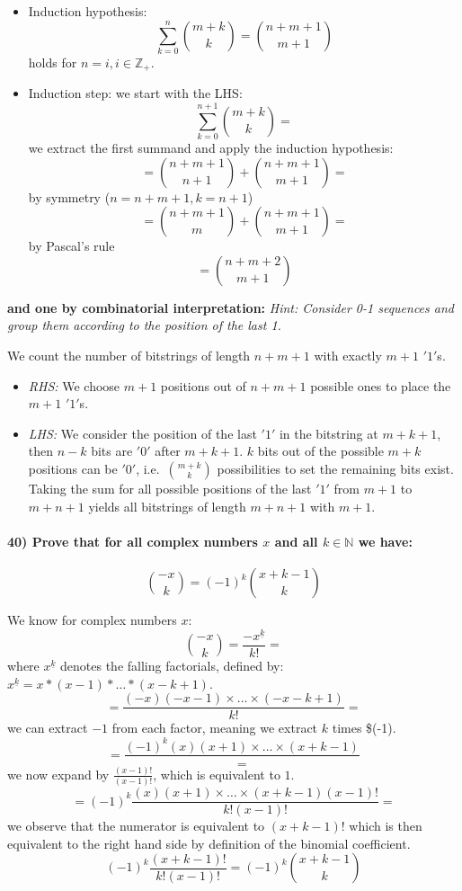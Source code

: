 \documentclass[
]{article}
\providecommand{\tightlist}{%
  \setlength{\itemsep}{0pt}\setlength{\parskip}{0pt}}
\begin{document}
\begin{itemize}
\item
  Induction hypothesis: \[
  \sum_{k=0}^{n} \binom{m+k}{k} = \binom{n+m+1}{m+1}
  \] holds for \(n=i, i \in \mathbb{Z}_{+}\).
\item
  Induction step: we start with the LHS: \[
  \sum_{k=0}^{n+1} \binom{m+k}{k} =
  \] we extract the first summand and apply the induction hypothesis: \[
  = \binom{n+m+1}{n+1} + \binom{n+m+1}{m+1} =
  \] by symmetry (\(n = n+m+1, k = n+1\)) \[
  = \binom{n+m+1}{m} + \binom{n+m+1}{m+1}=
  \] by Pascal's rule \[
  = \binom{n+m+2}{m+1}
  \]
\end{itemize}

\textbf{and one by combinatorial interpretation:} \emph{Hint: Consider
0-1 sequences and group them according to the position of the last 1.}

We count the number of bitstrings of length \(n+m+1\) with exactly
\(m+1\) \('1'\)s.

\begin{itemize}
\tightlist
\item
  \emph{RHS:} We choose \(m+1\) positions out of \(n+m+1\) possible ones
  to place the \(m+1\) \('1'\)s.
\item
  \emph{LHS:} We consider the position of the last \('1'\) in the
  bitstring at \(m+k+1\), then \(n-k\) bits are \('0'\) after \(m+k+1\).
  \(k\) bits out of the possible \(m+k\) positions can be \('0'\),
  i.e.~\(\binom{m+k}{k}\) possibilities to set the remaining bits exist.
  Taking the sum for all possible positions of the last \('1'\) from
  \(m+1\) to \(m+n+1\) yields all bitstrings of length \(m+n+1\) with
  \(m+1\).
\end{itemize}

\hypertarget{prove-that-for-all-complex-numbers-x-and-all-k-in-mathbbn-we-have}{%
\paragraph{\texorpdfstring{40) Prove that for all complex numbers \(x\)
and all \(k \in \mathbb{N}\) we
have:}{40) Prove that for all complex numbers x and all k \textbackslash in \textbackslash mathbb\{N\} we have:}}\label{prove-that-for-all-complex-numbers-x-and-all-k-in-mathbbn-we-have}}

\[
\binom{-x}{k} = (-1)^k \binom{x+k-1}{k}
\]

We know for complex numbers \(x\): \[
\binom{-x}{k} = \frac{-x^{\underline{k}}}{k!} =
\] where \(x^{\underline{k}}\) denotes the falling factorials, defined
by: \(x^{\underline{k}} = x * (x-1)* \dots * (x-k+1)\). \[
= \frac{(-x)(-x-1)\times \dots \times (-x-k+1)}{k!} =
\] we can extract \(-1\) from each factor, meaning we extract \(k\)
times \$(-1). \[
= \frac{(-1)^k (x) (x+1) \times \dots \times (x+k-1)} = 
\] we now expand by \(\frac{(x-1)!}{(x-1)!}\), which is equivalent to
\(1\). \[
= (-1)^k \frac{(x)(x+1) \times \dots \times (x+k-1)(x-1)!}{k!(x-1)!} =
\] we observe that the numerator is equivalent to \((x+k-1)!\) which is
then equivalent to the right hand side by definition of the binomial
coefficient. \[
(-1)^k \frac{(x+k-1)!}{k!(x-1)!} = (-1)^k \binom{x+k-1}{k}
\]
\end{document}
